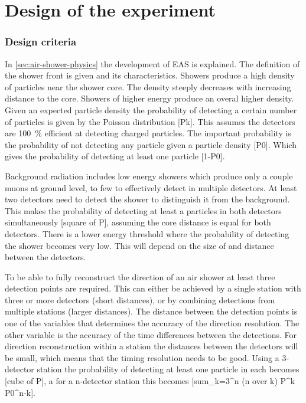 \chapter{Design of the \hisparc experiment}
\label{ch:experiment}

\subsection{Design criteria}

In \cref{sec:air-shower-physics} the development of EAS is explained. The definition of the shower front is given and its characteristics. Showers produce a high density of particles near the shower core. The density steeply decreases with increasing distance to the core. Showers of higher energy produce an overal higher density. Given an expected particle density the probability of detecting a certain number of particles is given by the Poisson distribution [Pk]. This assumes the detectors are \SI{100}{\percent} efficient at detecting charged particles. The important probability is the probability of not detecting any particle given a particle density [P0]. Which gives the probability of detecting at least one particle [1-P0].

Background radiation includes low energy showers which produce only a couple muons at ground level, to few to effectively detect in multiple detectors. At least two detectors need to detect the shower to distinguish it from the background. This makes the probability of detecting at least a particles in both detectors simultaneously [square of P], assuming the core distance is equal for both detectors. There is a lower energy threshold where the probability of detecting the shower becomes very low. This will depend on the size of and distance between the detectors.

To be able to fully reconstruct the direction of an air shower at least three detection points are required. This can either be achieved by a single station with three or more detectors (short distances), or by combining detections from multiple stations (larger distances). The distance between the detection points is one of the variables that determines the accuracy of the direction resolution. The other variable is the accuracy of the time differences between the detections. For direction reconstruction within a station the distances between the detectors will be small, which means that the timing resolution needs to be good. Using a 3-detector station the probability of detecting at least one particle in each becomes [cube of P], a for a n-detector station this becomes [sum_{k=3}^{n} (n over k) P^k P0^{n-k}].


